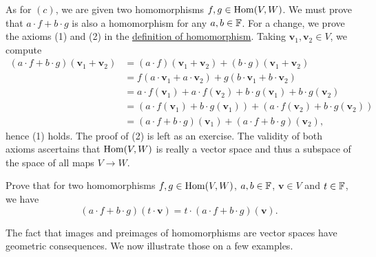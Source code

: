 \begin{lemproof}
 As for $(c)$, we are given two homomorphisms $f,g \in \operatorname{Hom}(V,W)$. We must prove
 that $a \cdot f + b \cdot g$ is also a homomorphism for any $a,b \in \mathbb{F}$. For a
 change, we prove the axioms (1) and (2) in the
 \hyperref[def:homomorphism]{definition of homomorphism}. Taking
 $\mathbf{v}_1,\mathbf{v}_2 \in V$, we compute
 \begin{align*}
  (a \cdot f + b \cdot g)(\mathbf{v}_1 + \mathbf{v}_2) 
  &= (a \cdot f)(\mathbf{v}_1 + \mathbf{v}_2) + (b \cdot g)(\mathbf{v}_1 +
  \mathbf{v}_2)\\
  &= f(a \cdot \mathbf{v}_1 + a \cdot \mathbf{v}_2) + g(b \cdot \mathbf{v}_1 +
  b \cdot \mathbf{v}_2)\\
  &= a \cdot f(\mathbf{v}_1) + a \cdot f(\mathbf{v}_2) + b \cdot g(\mathbf{v}_1)
  + b \cdot g(\mathbf{v}_2)\\
  &= (a \cdot f(\mathbf{v}_1) + b \cdot g(\mathbf{v}_1)) + (a \cdot
  f(\mathbf{v}_2) + b \cdot g(\mathbf{v}_2))\\
  &= (a \cdot f + b \cdot g)(\mathbf{v}_1) + (a \cdot f + b \cdot
  g)(\mathbf{v}_2),
 \end{align*}
 hence (1) holds. The proof of (2) is left as an exercise. The validity of both
 axioms ascertains that $\operatorname{Hom}(V,W)$ is really a vector space and thus a subspace
 of the space of all maps $V \to W$.
\end{lemproof}

\begin{exercise}{}{}
 Prove that for two homomorphisms $f,g \in \operatorname{Hom}(V,W)$, $a,b \in \mathbb{F}$, $\mathbf{v}
 \in V$ and $t \in \mathbb{F}$, we have
 \[
  (a \cdot f + b \cdot g)(t \cdot \mathbf{v}) = t \cdot (a \cdot f + b \cdot
  g)(\mathbf{v}).
 \]
\end{exercise}

The fact that images and preimages of homomorphisms are vector spaces have
geometric consequences. We now illustrate those on a few examples.

